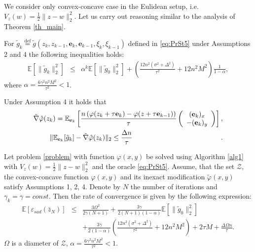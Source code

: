 \documentclass[runningheads]{llncs}
\def\eqdef{\overset{\text{def}}{=}}
\begin{document}
We consider only convex-concave case in the Eulidean setup, i.e. $V_z(w) = \frac{1}{2}\|z - w \|_2^2$. Let us carry out reasoning similar to the analysis of Theorem \ref{th_main}.

\begin{lemma}
    \label{beznos1}
    For $\tilde g_k \eqdef \tilde g(z_k, z_{k-1},  \mathbf{e}_k, \mathbf{e}_{k-1},  \xi_k, \xi_{k-1})$ defined in \eqref{eq:PrSt5} under Assumptions 2 and 4 the following inequalities holds:
    \begin{eqnarray}
    \label{boundlem1}
    \mathbb{E}\left[\|\tilde g_k\|^2_2\right] 
    &\leq& \alpha^k\mathbb{E}\left[\|\tilde g_{0}\|^2_2 \right] + \left(\frac{12n^2 (\sigma^2 + \Delta^2)}{\tau^2}+ 12n^2M^2\right) \frac{1}{1 - \alpha},
    \end{eqnarray}
     where  $\alpha = \frac{6\gamma^2 n^2M^2}{\tau^2} < 1$.
\end{lemma}

\begin{lemma}
    Under Assumption 4 it holds that 
    \begin{eqnarray}
    \label{temp9851}
    \tilde \nabla \hat{\varphi}(z_k) = \mathbb{E}_{\mathbf{e}_k}\left[\frac{n\left(\varphi(z_k + \tau \mathbf{e}_k) -  \varphi(z + \tau \mathbf{e}_{k-1})\right)}{\tau}\left(
    \begin{array}{c}
    (\mathbf{e}_k)_x\\
    -(\mathbf{e}_k)_y \\
    \end{array}\right)\right],\\
    \|\mathbb{E}_{\mathbf{e}_k}[ \tilde g_k ] - \tilde \nabla \hat{\varphi}(z_k)\|_2 \leq \frac{\Delta n}{\tau} \hspace{4.5cm}\label{temp9861}.
    \end{eqnarray}
\end{lemma}

\begin{theorem} 
Let problem \eqref{problem} with function $\varphi(x,y)$ be solved using Algorithm \ref{alg1} with $V_z(w) = \frac{1}{2}\|z-w\|^2_2$ and the oracle \eqref{eq:PrSt5}. Assume, that the set $\mathcal{Z}$, the convex-concave function $\varphi(x,y)$ and its inexact modification $\widetilde{\varphi}(x,y)$ satisfy Assumptions 1, 2, 4. Denote by $N$ the number of iterations and $\gamma_k = \gamma = const$. Then the rate of convergence is given by the following expression:
\begin{eqnarray*}
    \mathbb{E}\left[\varepsilon_{sad}(\bar z_{N})\right] &\leq&
    \frac{3\Omega^2}{2\gamma(N+1)} + \frac{3\gamma}{2(N+1)(1 - \alpha)} \mathbb{E}\left[\|\tilde g_{0}\|^2_2 \right] \nonumber\\
    && + \frac{3\gamma}{2(1 - \alpha)} \left(\frac{12n^2 (\sigma^2 + \Delta^2)}{\tau^2}+ 12n^2M^2\right)  + 2\tau M  + \frac{\Delta \Omega n}{\tau}.
\end{eqnarray*} 
$\Omega$ is a diameter of $\mathcal{Z}$, $\alpha = \frac{6\gamma^2 n^2M^2}{\tau^2} < 1$.
\end{theorem}
\end{document}
